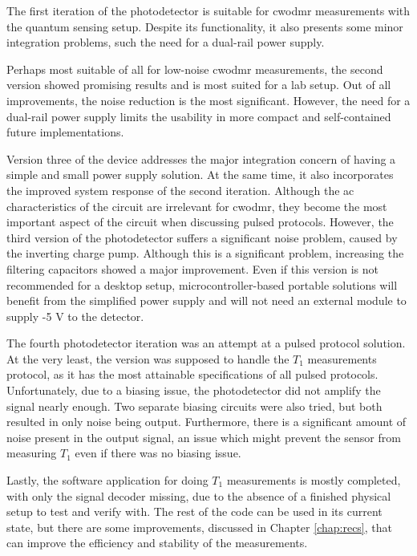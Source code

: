 The first iteration of the photodetector is suitable for \gls{cwodmr} measurements with the quantum sensing setup. Despite its functionality, it also presents some minor integration problems, such the need for a dual-rail power supply. 

Perhaps most suitable of all for low-noise \gls{cwodmr} measurements, the second version showed promising results and is most suited for a lab setup. Out of all improvements, the noise reduction is the most significant. However, the need for a dual-rail power supply limits the usability in more compact and self-contained future implementations.

Version three of the device addresses the major integration concern of having a simple and small power supply solution. At the same time, it also incorporates the improved system response of the second iteration. Although the \gls{ac} characteristics of the circuit are irrelevant for \gls{cwodmr}, they become the most important aspect of the circuit when discussing pulsed protocols. However, the third version of the photodetector suffers a significant noise problem, caused by the inverting charge pump. Although this is a significant problem, increasing the filtering capacitors showed a major improvement. Even if this version is not recommended for a desktop setup, microcontroller-based portable solutions will benefit from the simplified power supply and will not need an external module to supply -5 \unit{\volt} to the detector.

The fourth photodetector iteration was an attempt at a pulsed protocol solution. At the very least, the version was supposed to handle the $T_1$ measurements protocol, as it has the most attainable specifications of all pulsed protocols. Unfortunately, due to a biasing issue, the photodetector did not amplify the signal nearly enough. Two separate biasing circuits were also tried, but both resulted in only noise being output. Furthermore, there is a significant amount of noise present in the output signal, an issue which might prevent the sensor from measuring $T_1$ even if there was no biasing issue.

Lastly, the software application for doing $T_1$ measurements is mostly completed, with only the signal decoder missing, due to the absence of a finished physical setup to test and verify with. The rest of the code can be used in its current state, but there are some improvements, discussed in Chapter \ref{chap:recs}, that can improve the efficiency and stability of the measurements.


